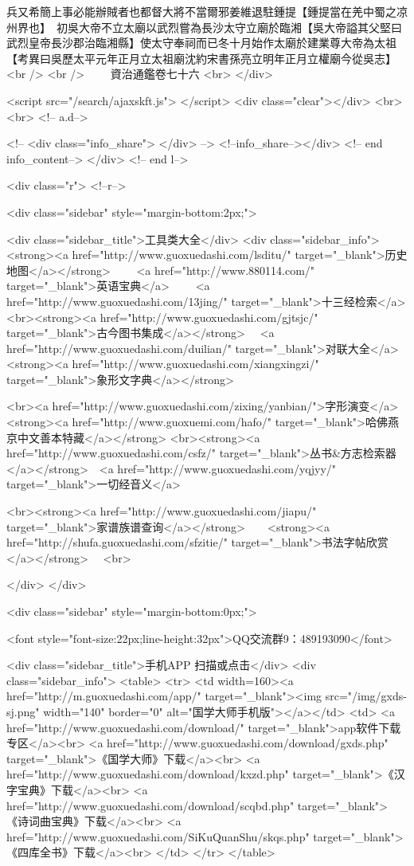 兵又希簡上事必能辦賊者也都督大將不當爾邪姜維退駐鍾提【鍾提當在羌中蜀之凉州界也】　初吳大帝不立太廟以武烈嘗為長沙太守立廟於臨湘【吳大帝謚其父堅曰武烈皇帝長沙郡治臨湘縣】使太守奉祠而已冬十月始作太廟於建業尊大帝為太祖　【考異曰吳歷太平元年正月立太祖廟沈約宋書孫亮立明年正月立權廟今從吳志】<br />
<br />
　　資治通鑑卷七十六  <br>
   </div> 

<script src="/search/ajaxskft.js"> </script>
 <div class="clear"></div>
<br>
<br>
 <!-- a.d-->

 <!--
<div class="info_share">
</div> 
-->
 <!--info_share--></div>   <!-- end info_content-->
  </div> <!-- end l-->

<div class="r">   <!--r-->



<div class="sidebar"  style="margin-bottom:2px;">

 
<div class="sidebar_title">工具类大全</div>
<div class="sidebar_info">
<strong><a href="http://www.guoxuedashi.com/lsditu/" target="_blank">历史地图</a></strong>　　
<a href="http://www.880114.com/" target="_blank">英语宝典</a>　　
<a href="http://www.guoxuedashi.com/13jing/" target="_blank">十三经检索</a>　
<br><strong><a href="http://www.guoxuedashi.com/gjtsjc/" target="_blank">古今图书集成</a></strong>　
<a href="http://www.guoxuedashi.com/duilian/" target="_blank">对联大全</a>　<strong><a href="http://www.guoxuedashi.com/xiangxingzi/" target="_blank">象形文字典</a></strong>　

<br><a href="http://www.guoxuedashi.com/zixing/yanbian/">字形演变</a>　　<strong><a href="http://www.guoxuemi.com/hafo/" target="_blank">哈佛燕京中文善本特藏</a></strong>
<br><strong><a href="http://www.guoxuedashi.com/csfz/" target="_blank">丛书&方志检索器</a></strong>　<a href="http://www.guoxuedashi.com/yqjyy/" target="_blank">一切经音义</a>　　

<br><strong><a href="http://www.guoxuedashi.com/jiapu/" target="_blank">家谱族谱查询</a></strong>　　<strong><a href="http://shufa.guoxuedashi.com/sfzitie/" target="_blank">书法字帖欣赏</a></strong>　
<br>

</div>
</div>


<div class="sidebar" style="margin-bottom:0px;">

<font style="font-size:22px;line-height:32px">QQ交流群9：489193090</font>


<div class="sidebar_title">手机APP 扫描或点击</div>
<div class="sidebar_info">
<table>
<tr>
	<td width=160><a href="http://m.guoxuedashi.com/app/" target="_blank"><img src="/img/gxds-sj.png" width="140"  border="0" alt="国学大师手机版"></a></td>
	<td>
<a href="http://www.guoxuedashi.com/download/" target="_blank">app软件下载专区</a><br>
<a href="http://www.guoxuedashi.com/download/gxds.php" target="_blank">《国学大师》下载</a><br>
<a href="http://www.guoxuedashi.com/download/kxzd.php" target="_blank">《汉字宝典》下载</a><br>
<a href="http://www.guoxuedashi.com/download/scqbd.php" target="_blank">《诗词曲宝典》下载</a><br>
<a href="http://www.guoxuedashi.com/SiKuQuanShu/skqs.php" target="_blank">《四库全书》下载</a><br>
</td>
</tr>
</table>

